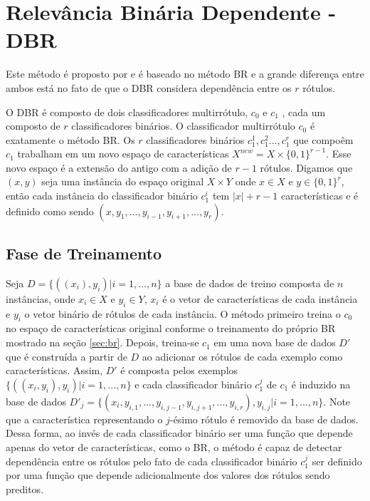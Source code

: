 \section{Relevância Binária Dependente - DBR}
\label{sec:dbr}
Este método é proposto por \cite{dbr2014} e é baseado no método BR
e a grande diferença entre ambos está no fato de 
que o DBR considera dependência entre os $r$ rótulos.

O DBR é composto de dois classificadores multirrótulo, $c_0$ e $c_1$ , 
cada um composto de $r$ classificadores binários. O classificador multirrótulo $c_0$ é
exatamente o método BR. Os $r$ classificadores binários $c_1^1,c_1^2...,c_1^r$ que compoêm $c_1$ 
  trabalham em um novo espaço de características $X^{new}=X \times \{0,1\}^{r-1}$.
  Esse novo espaço é a extensão do antigo com a adição de $r-1$ rótulos.
  Digamos que $(x,y)$ seja uma instância do espaço original $X \times Y$
  onde $x \in X$ e $y \in {\{0,1\}}^{r}$, então cada instância
  do classificador binário $c_1^i$ tem $|x|+r-1$ características
  e é definido como sendo $(x,y_1,...,y_{i-1},y_{i+1},...,y_{r})$.
  
  \subsection{Fase de Treinamento}
  Seja $D=\{((x_i),y_i)|i=1,...,n\}$ a base de dados de treino composta de $n$ instâncias,
  onde $x_i \in X$ e $y_i \in Y$,
  $x_i$ é o vetor de características de cada instância
  e $y_i$ o vetor binário de rótulos de cada instância.
  O método primeiro treina o $c_0$
  no espaço de características original conforme o treinamento do próprio BR mostrado na seção \ref{sec:br}.
  Depois, treina-se $c_1$ em uma nova base de dados $D'$ que é construída a partir de $D$ ao adicionar os rótulos de cada
  exemplo como características.
  Assim, $D'$ é composta pelos exemplos $\{((x_i,y_i),y_i) |i=1,...,n\}$ e
  cada classificador binário $c_1^j$ de $c_1$ é induzido na base de dados
  $D'_j=\{(x_i,y_{i,1},...,y_{i,j-1},y_{i,j+1},...,y_{i,r}),y_{i,j} | i=1,...,n\}$.
  Note que a característica representando o $j$-ésimo rótulo é removido da base de dados.
  Dessa forma, ao invés de cada classificador binário ser uma função 
  que depende apenas do vetor de características, como o BR,
  o método é capaz de detectar dependência entre os rótulos pelo fato de
  cada classificador binário $c_1^j$ 
  ser definido por uma função que depende adicionalmente dos valores dos rótulos sendo preditos.
  
